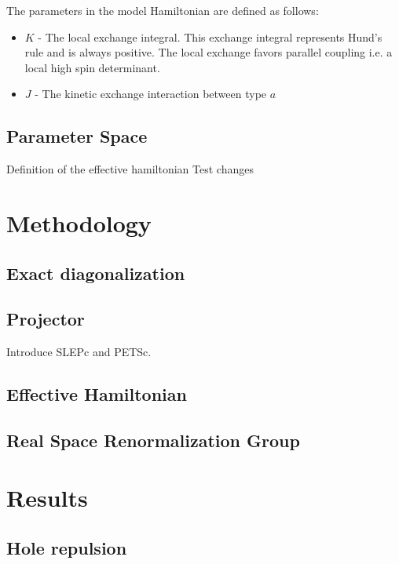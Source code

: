 \documentclass[ openright,titlepage,numbers=noenddot,headinclude,twoside,%
                footinclude=true,cleardoublepage=empty,abstractoff,%
                BCOR=5mm,paper=a4,fontsize=11pt,%
                ngerman,american,%
]{scrreprt}
\begin{document}
The parameters in the model Hamiltonian are defined as follows:
\begin{itemize}

\item $K$ - The local exchange integral. This exchange integral represents
  Hund's rule and is always positive. The local exchange favors parallel
  coupling i.e. a local high spin determinant.

\item $J$ - The kinetic exchange interaction between type $a$

\end{itemize}

\section{Parameter Space}

Definition of the effective hamiltonian
Test changes


\chapter{Methodology}

\section{Exact diagonalization}

\section{Projector}

Introduce SLEPc and PETSc.

\section{Effective Hamiltonian}

\section{Real Space Renormalization Group}

\chapter{Results}

\section{Hole repulsion}
\end{document}
